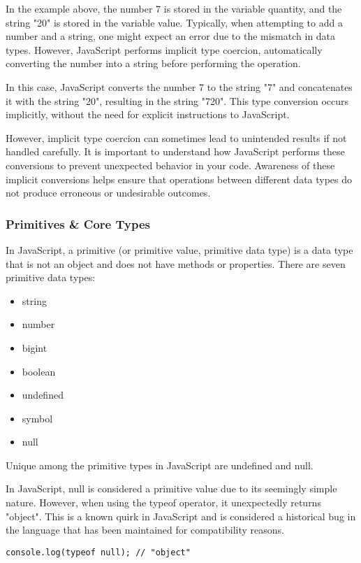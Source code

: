 In the example above, the number 7 is stored in the variable quantity, and the string "20" is stored in the variable value. Typically, when attempting to add a number and a string, one might expect an error due to the mismatch in data types. However, JavaScript performs implicit type coercion, automatically converting the number into a string before performing the operation.

In this case, JavaScript converts the number 7 to the string "7" and concatenates it with the string "20", resulting in the string "720". This type conversion occurs implicitly, without the need for explicit instructions to JavaScript.

However, implicit type coercion can sometimes lead to unintended results if not handled carefully. It is important to understand how JavaScript performs these conversions to prevent unexpected behavior in your code. Awareness of these implicit conversions helps ensure that operations between different data types do not produce erroneous or undesirable outcomes.

\subsubsection{Primitives \& Core Types}

In JavaScript, a primitive (or primitive value, primitive data type) is a data type that is not an object and does not have methods or properties. There are seven primitive data types:

\begin{itemize}
	\item string
	\item number
	\item bigint
	\item boolean
	\item undefined
	\item symbol
	\item null
\end{itemize}

Unique among the primitive types in JavaScript are undefined and null.

In JavaScript, null is considered a primitive value due to its seemingly simple nature. However, when using the typeof operator, it unexpectedly returns "object". This is a known quirk in JavaScript and is considered a historical bug in the language that has been maintained for compatibility reasons.

\begin{lstlisting}[caption=typeof null return "object" in JavaScript ]
	console.log(typeof null); // "object"
\end{lstlisting}

